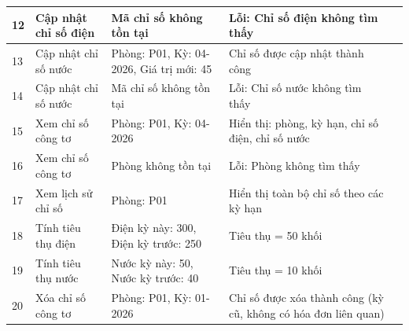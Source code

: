 \documentclass[12pt,a4paper]{article}
\begin{document}
\begin{table}[h!]
\begin{small}
\begin{tabularx}{\textwidth}{|p{0.8cm}|p{2.5cm}|p{3cm}|p{3cm}|p{2.5cm}|}
    12 & Cập nhật chỉ số điện & Mã chỉ số không tồn tại & Lỗi: Chỉ số điện không tìm thấy & \\ \hline

    13 & Cập nhật chỉ số nước & Phòng: P01, Kỳ: 04-2026, Giá trị mới: 45 & Chỉ số được cập nhật thành công & \\ \hline

    14 & Cập nhật chỉ số nước & Mã chỉ số không tồn tại & Lỗi: Chỉ số nước không tìm thấy & \\ \hline

    15 & Xem chỉ số công tơ & Phòng: P01, Kỳ: 04-2026 & Hiển thị: phòng, kỳ hạn, chỉ số điện, chỉ số nước & \\ \hline

    16 & Xem chỉ số công tơ & Phòng không tồn tại & Lỗi: Phòng không tìm thấy & \\ \hline

    17 & Xem lịch sử chỉ số & Phòng: P01 & Hiển thị toàn bộ chỉ số theo các kỳ hạn & \\ \hline

    18 & Tính tiêu thụ điện & Điện kỳ này: 300, Điện kỳ trước: 250 & Tiêu thụ = 50 khối & \\ \hline

    19 & Tính tiêu thụ nước & Nước kỳ này: 50, Nước kỳ trước: 40 & Tiêu thụ = 10 khối & \\ \hline

    20 & Xóa chỉ số công tơ & Phòng: P01, Kỳ: 01-2026 & Chỉ số được xóa thành công (kỳ cũ, không có hóa đơn liên quan) & \\ \hline

    \end{tabularx}
    \end{small}
\end{table}
\end{document}
